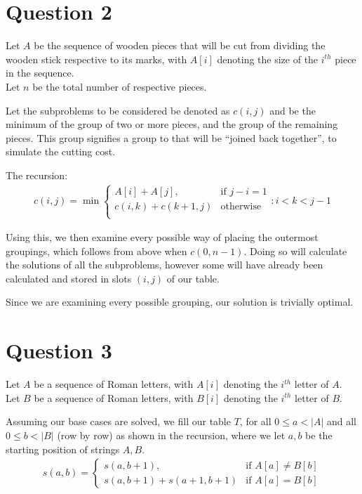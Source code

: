 \documentclass{article}
\begin{document}
\pagebreak
\section*{Question 2}
Let $A$ be the sequence of wooden pieces that will be cut from dividing the wooden stick respective to its marks, with $A[i]$ denoting the size of the $i^{th}$ piece in the sequence.\\
Let $n$ be the total number of respective pieces.

Let the subproblems to be considered be denoted as $c(i, j)$ and be the minimum of the group of two or more pieces, and the group of the remaining pieces. This group signifies a group to that will be ``joined back together'', to simulate the cutting cost.

The recursion:
\begin{align*}
c(i, j) = \min
\begin{cases}
    A[i] + A[j],        & \text{if } j - i = 1\\
    c(i, k) + c(k+1, j) & \text{otherwise}\\
\end{cases}
    : i < k < j - 1
\end{align*}

Using this, we then examine every possible way of placing the outermost groupings, which follows from above when $c(0, n-1)$. Doing so will calculate the solutions of all the subproblems, however some will have already been calculated and stored in slots $(i, j)$ of our table.

Since we are examining every possible grouping, our solution is trivially optimal.

\section*{Question 3}
Let $A$ be a sequence of Roman letters, with $A[i]$ denoting the $i^{th}$ letter of $A$.\\
Let $B$ be a sequence of Roman letters, with $B[i]$ denoting the $i^{th}$ letter of $B$.

Assuming our base cases are solved, we fill our table $T$, for all $0 \leq a < |A|$ and all $0 \leq b < |B|$ (row by row) as shown in the recursion, where we let $a, b$ be the starting position of strings $A, B$.
\begin{align*}
s(a, b) =
\begin{cases}
    s(a, b+1),              & \text{if } A[a] \neq B[b]\\
    s(a, b+1) + s(a+1, b+1) & \text{if } A[a] = B[b]
\end{cases}
\end{align*}
\end{document}
